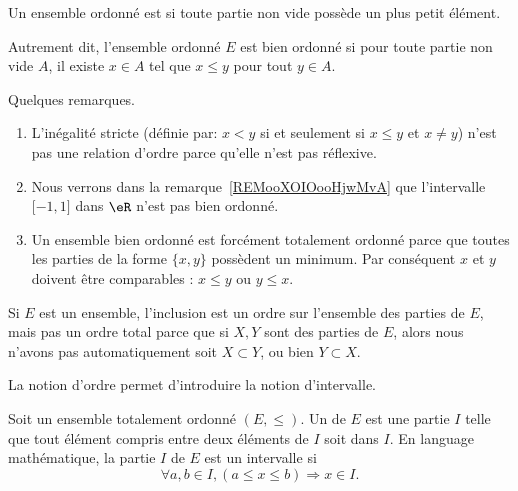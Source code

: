 \begin{definition}   \label{DEFooLJEAooBLGsiS}
    Un ensemble ordonné est  si toute partie non vide possède un plus petit élément.
\end{definition}

Autrement dit, l'ensemble ordonné \( E\) est bien ordonné si pour toute partie non vide \( A\), il existe \( x\in A\) tel que \( x\leq y\) pour tout \( y\in A\).

\begin{normaltext}
    Quelques remarques.
    \begin{enumerate}
        \item
            L'inégalité stricte (définie par: \( x<y\) si et seulement si \( x\leq y\) et \( x\neq y\)) n'est pas une relation d'ordre parce qu'elle n'est pas réflexive.
        \item
            Nous verrons dans la remarque~\ref{REMooXOIOooHjwMvA} que l'intervalle \( \mathopen[ -1 , 1 \mathclose]\) dans \( \eR\) n'est pas bien ordonné.
        \item
            Un ensemble bien ordonné est forcément totalement ordonné parce que toutes les parties de la forme \( \{ x,y \}\) possèdent un minimum. Par conséquent \( x\) et \( y\) doivent être comparables : \( x\leq y\) ou \( y\leq x\).
    \end{enumerate}
\end{normaltext}

\begin{example}
    Si \( E\) est un ensemble, l'inclusion est un ordre sur l'ensemble des parties de \( E\), mais pas un ordre total parce que si \( X,Y\) sont des parties de \( E\), alors nous n'avons pas automatiquement soit \( X\subset Y\), ou bien \( Y\subset X\).
\end{example}

La notion d'ordre permet d'introduire la notion d'intervalle.

\begin{definition}  \label{DefEYAooMYYTz}
    Soit un ensemble totalement ordonné \( (E,\leq)\). Un  de \( E\) est une partie \( I\) telle que tout élément compris entre deux éléments de \( I \) soit dans \( I \). En language mathématique, la partie \( I \) de \( E\) est un intervalle si
    \[
      \forall a,b\in I,(a\leq x\leq b)\Rightarrow x\in I.
    \]
\end{definition}

